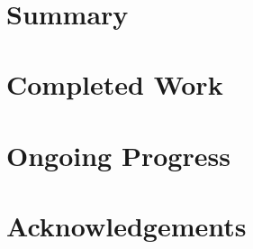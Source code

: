 \documentclass[twoside]{article}
\title{\vspace{-15mm}\fontsize{24pt}{10pt}\selectfont\textbf{}} %
\date{}
\begin{document}


\maketitle %

\thispagestyle{fancy} %

%
%
%


\begin{multicols}{2} %

\section{Summary}

{}



\section{Completed Work}

{}


\section{Ongoing Progress}

{}


\section{Acknowledgements}
{}


\begin{thebibliography}{99}
\end{thebibliography}


\end{multicols}
\end{document}
